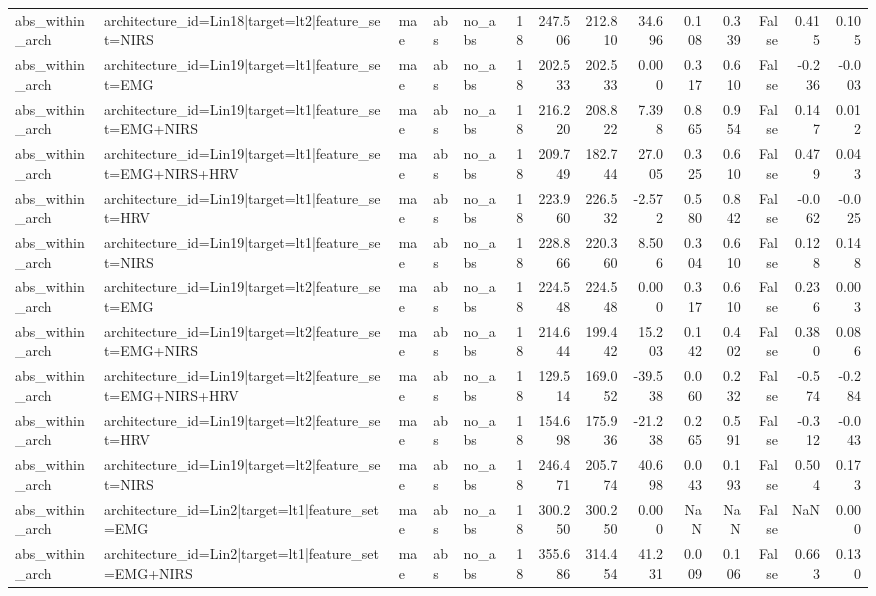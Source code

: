 \begin{table}
\begin{tabular}{lllllrrrrrrrrr}
abs_within_arch & architecture_id=Lin18|target=lt2|feature_set=NIRS & mae & abs & no_abs & 18 & 247.506 & 212.810 & 34.696 & 0.108 & 0.339 & False & 0.415 & 0.105 \\
abs_within_arch & architecture_id=Lin19|target=lt1|feature_set=EMG & mae & abs & no_abs & 18 & 202.533 & 202.533 & 0.000 & 0.317 & 0.610 & False & -0.236 & -0.003 \\
abs_within_arch & architecture_id=Lin19|target=lt1|feature_set=EMG+NIRS & mae & abs & no_abs & 18 & 216.220 & 208.822 & 7.398 & 0.865 & 0.954 & False & 0.147 & 0.012 \\
abs_within_arch & architecture_id=Lin19|target=lt1|feature_set=EMG+NIRS+HRV & mae & abs & no_abs & 18 & 209.749 & 182.744 & 27.005 & 0.325 & 0.610 & False & 0.479 & 0.043 \\
abs_within_arch & architecture_id=Lin19|target=lt1|feature_set=HRV & mae & abs & no_abs & 18 & 223.960 & 226.532 & -2.572 & 0.580 & 0.842 & False & -0.062 & -0.025 \\
abs_within_arch & architecture_id=Lin19|target=lt1|feature_set=NIRS & mae & abs & no_abs & 18 & 228.866 & 220.360 & 8.506 & 0.304 & 0.610 & False & 0.128 & 0.148 \\
abs_within_arch & architecture_id=Lin19|target=lt2|feature_set=EMG & mae & abs & no_abs & 18 & 224.548 & 224.548 & 0.000 & 0.317 & 0.610 & False & 0.236 & 0.003 \\
abs_within_arch & architecture_id=Lin19|target=lt2|feature_set=EMG+NIRS & mae & abs & no_abs & 18 & 214.644 & 199.442 & 15.203 & 0.142 & 0.402 & False & 0.380 & 0.086 \\
abs_within_arch & architecture_id=Lin19|target=lt2|feature_set=EMG+NIRS+HRV & mae & abs & no_abs & 18 & 129.514 & 169.052 & -39.538 & 0.060 & 0.232 & False & -0.574 & -0.284 \\
abs_within_arch & architecture_id=Lin19|target=lt2|feature_set=HRV & mae & abs & no_abs & 18 & 154.698 & 175.936 & -21.238 & 0.265 & 0.591 & False & -0.312 & -0.043 \\
abs_within_arch & architecture_id=Lin19|target=lt2|feature_set=NIRS & mae & abs & no_abs & 18 & 246.471 & 205.774 & 40.698 & 0.043 & 0.193 & False & 0.504 & 0.173 \\
abs_within_arch & architecture_id=Lin2|target=lt1|feature_set=EMG & mae & abs & no_abs & 18 & 300.250 & 300.250 & 0.000 & NaN & NaN & False & NaN & 0.000 \\
abs_within_arch & architecture_id=Lin2|target=lt1|feature_set=EMG+NIRS & mae & abs & no_abs & 18 & 355.686 & 314.454 & 41.231 & 0.009 & 0.106 & False & 0.663 & 0.130 \\

\end{tabular}
\end{table}
